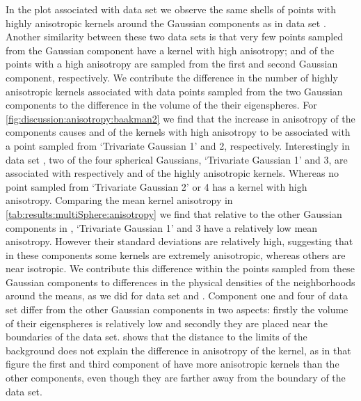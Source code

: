 			In the plot associated with data set \ferdosiTwo we observe the same shells of points with highly anisotropic kernels around the Gaussian components as in data set \ferdosiOne. Another similarity between these two data sets is that very few points sampled from the Gaussian component have a kernel with high anisotropy;  and  of the points with a high anisotropy are sampled from the first and second Gaussian component, respectively. 
			We contribute the difference in the number of highly anisotropic kernels associated with data points sampled from the two Gaussian components to the difference in the volume of the their eigenspheres.
			For \cref{fig:discussion:anisotropy:baakman2} we find that the increase in anisotropy of the components causes  and  of the kernels with high anisotropy to be associated with a point sampled from `Trivariate Gaussian 1' and 2, respectively. 
			Interestingly in data set \ferdosiThree, two of the four spherical Gaussians, `Trivariate Gaussian 1' and 3, are associated with respectively  and  of the highly anisotropic kernels. Whereas no point sampled from `Trivariate Gaussian 2' or 4 has a kernel with high anisotropy.
			Comparing the mean kernel anisotropy in \cref{tab:results:multiSphere:anisotropy} we find that relative to the other Gaussian components in \ferdosiThree, `Trivariate Gaussian 1' and 3 have a relatively low mean anisotropy. However their standard deviations are relatively high, suggesting that in these components some kernels are extremely anisotropic, whereas others are near isotropic. We contribute this difference within the points sampled from these Gaussian components to differences in the physical densities of the neighborhoods around the means, as we did for data set \ferdosiOne and \baakmanOne.
			Component one and four of data set \ferdosiThree differ from the other Gaussian components in two aspects: firstly the volume of their eigenspheres is relatively low and secondly they are placed near the boundaries of the data set. 
				 shows that the distance to the limits of the background does not explain the difference in anisotropy of the kernel, as in that figure the first and third component of \ferdosiThreeNoise have more anisotropic kernels than the other components, even though they are farther away from the boundary of the data set.
